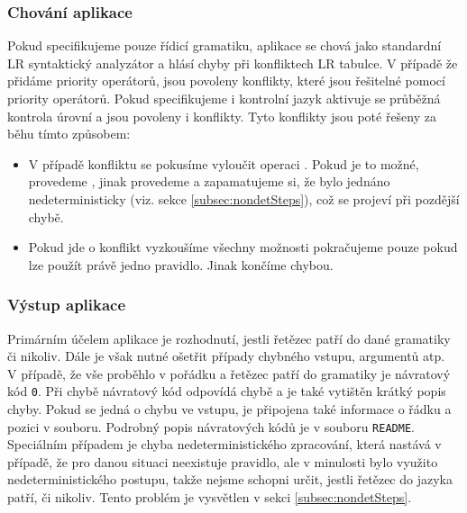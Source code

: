 \subsubsection*{Chování aplikace}

Pokud specifikujeme pouze řídicí gramatiku, aplikace se chová jako
standardní LR syntaktický analyzátor a hlásí chyby při konfliktech LR tabulce.
V případě že přidáme priority operátorů, jsou povoleny 
konflikty, které jsou řešitelné pomocí priority operátorů.
Pokud specifikujeme i kontrolní jazyk aktivuje se
průběžná kontrola úrovní a jsou povoleny  i
 konflikty. Tyto konflikty jsou poté
řešeny za běhu tímto způsobem:

\begin{itemize}
  \item V případě  konfliktu se pokusíme vyloučit operaci
    . Pokud je to možné, provedeme , jinak
    provedeme  a zapamatujeme si, že bylo jednáno
    nedeterministicky (viz. sekce \ref{subsec:nondetSteps}), což se projeví při pozdější chybě.
  \item Pokud jde o  konflikt vyzkoušíme všechny možnosti
    pokračujeme pouze pokud lze použít právě jedno pravidlo. Jinak končíme
    chybou.
\end{itemize}

\subsubsection*{Výstup aplikace}

Primárním účelem aplikace je rozhodnutí, jestli řetězec patří do dané
gramatiky či nikoliv. Dále je však nutné ošetřit případy chybného vstupu,
argumentů atp.\\

V případě, že vše proběhlo v pořádku a řetězec patří do gramatiky je návratový
kód \texttt{0}. Při chybě návratový kód odpovídá chybě a je také vytištěn krátký
popis chyby. Pokud se jedná o chybu ve vstupu, je připojena také informace o
řádku a pozici v souboru. Podrobný popis návratových kódů je v souboru \texttt{README}.\\

Speciálním případem je chyba nedeterministického zpracování, která nastává
v případě, že pro danou situaci neexistuje pravidlo, ale v minulosti
bylo využito nedeterministického postupu, takže nejsme schopni určit, jestli
řetězec do jazyka patří, či nikoliv. Tento problém je vysvětlen v sekci
\ref{subsec:nondetSteps}.

